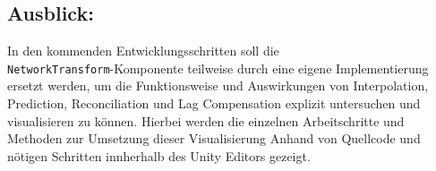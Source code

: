 \subsection{Ausblick:}
In den kommenden Entwicklungsschritten soll die \\ \texttt{NetworkTransform}-Komponente teilweise durch eine eigene Implementierung ersetzt werden, um die Funktionsweise und Auswirkungen von Interpolation, Prediction, Reconciliation und Lag Compensation explizit untersuchen und visualisieren zu können.
Hierbei werden die einzelnen Arbeitschritte und Methoden zur Umsetzung dieser Visualisierung Anhand von Quellcode und nötigen Schritten innherhalb des Unity Editors gezeigt. 

